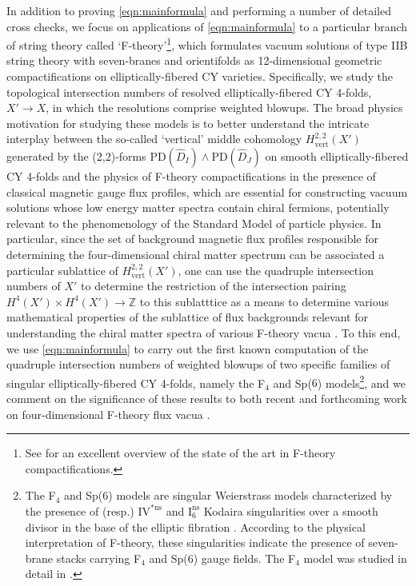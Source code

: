\documentclass[11pt,oneside,english]{article}
\numberwithin{equation}{section}
\theoremstyle{definition}
\begin{document}
In addition to proving \cref{eqn:mainformula} and performing a number of detailed cross checks, we focus on applications of \cref{eqn:mainformula} to a particular branch of string theory called `F-theory'\footnote{See \cite{Weigand:2018rez} for an excellent overview of the state of the art in F-theory compactifications.}, which formulates vacuum solutions of type IIB string theory with seven-branes and orientifolds as 12-dimensional geometric compactifications on elliptically-fibered CY varieties. Specifically, we study the topological intersection numbers of resolved elliptically-fibered CY 4-folds, $X' \rightarrow X$, in which the resolutions comprise weighted blowups.  The broad physics motivation for studying these models is to better understand the intricate interplay between the so-called `vertical' middle cohomology $H^{2,2}_{\text{vert}}(X')$ \cite{Greene:1993vm} generated by the (2,2)-forms $\text{PD}(\hat D_I) \wedge \text{PD}(\hat D_J)$ on smooth elliptically-fibered CY 4-folds and the physics of F-theory compactifications in the presence of classical magnetic gauge flux profiles, which are essential for constructing vacuum solutions whose low energy matter spectra contain chiral fermions, potentially relevant to the phenomenology of the Standard Model of particle physics. In particular, since the set of background magnetic flux profiles responsible for determining the four-dimensional chiral matter spectrum can be associated a particular sublattice of $H^{2,2}_{\text{vert}}(X')$, one can use the quadruple intersection numbers of $X'$ to determine the restriction of the intersection pairing $H^4(X') \times H^4(X') \rightarrow \mathbb Z$ to this sublatttice as a means to determine various mathematical properties of the sublattice of flux backgrounds relevant for understanding the chiral matter spectra of various F-theory vacua \cite{Jefferson:2021bid}. To this end, we use \cref{eqn:mainformula} to carry out the first known computation of the quadruple intersection numbers of weighted blowups of two specific families of singular elliptically-fibered CY 4-folds, namely the F$_4$ and Sp($6$) models\footnote{The F$_4$ and Sp($6$) models are singular Weierstrass models characterized by the presence of (resp.) $\text{IV}^{*\text{ns}}$ and $\text{I}_6^{\text{ns}}$ Kodaira singularities over a smooth divisor in the base of the elliptic fibration \cite{Katz:2011qp}. According to the physical interpretation of F-theory, these singularities indicate the presence of seven-brane stacks carrying F$_4$ and Sp($6$) gauge fields. The F$_4$ model was studied in detail in \cite{Esole:2017rgz}.}, and we comment on the significance of these results to both recent and forthcoming work on four-dimensional F-theory flux vacua \cite{JKT}.
\end{document}
